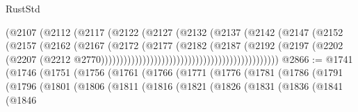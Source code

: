 \begin{lexlean}{RustStd}
\begin{coremodule}
{\begin{coremodule}
{{{{{{{{{{{{{{{{{{{{{{{{{{{{{{{{{{{{{{{{{{{{{                                                      (@2107
                                                        (@2112
                                                          (@2117
                                                            (@2122
                                                              (@2127
                                                                (@2132
                                                                  (@2137
                                                                    (@2142
                                                                      (@2147
                                                                        (@2152
                                                                          (@2157
                                                                            (@2162
                                                                              (@2167
                                                                                (@2172
                                                                                  (@2177
                                                                                    (@2182
                                                                                      (@2187
                                                                                        (@2192
                                                                                          (@2197
                                                                                            (@2202
                                                                                              (@2207
                                                                                                (@2212
                                                                                                  @2770)))))))))))))))))))))))))))))))))))))))))))))))
@2866 := @1741
    (@1746
      (@1751
        (@1756
          (@1761
            (@1766
              (@1771
                (@1776
                  (@1781
                    (@1786
                      (@1791
                        (@1796
                          (@1801
                            (@1806
                              (@1811
                                (@1816
                                  (@1821
                                    (@1826
                                      (@1831
                                        (@1836
                                          (@1841
                                            (@1846
}}}}}}}}}}}}}}}}}}}}}}}}}}}}}}}}}}}}}}}}}}}}}
\end{coremodule}}
\end{coremodule}
\end{lexlean}
